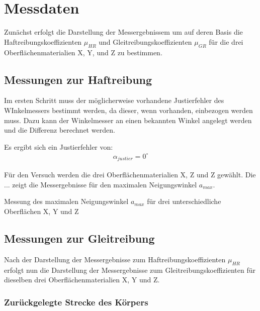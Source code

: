 \section{Messdaten}

Zunächst erfolgt die Darstellung der Messergebnissem um auf deren Basis die Haftreibungskoeffizienten $\mu_{HR}$ und Gleitreibungskoeffizienten $\mu_{GR}$ für die drei Oberflächenmaterialien X, Y, und Z zu bestimmen.

\subsection{Messungen zur Haftreibung} \label{chap:MessungHaftreibung}

Im ersten Schritt muss der möglicherweise vorhandene Justierfehler des WInkelmessers bestimmt werden, da dieser, wenn vorhanden, einbezogen werden muss. Dazu kann der Winkelmesser an einen bekannten Winkel angelegt werden und die Differenz berechnet werden. 

Es ergibt sich ein Justierfehler von:
\begin{align*}
    \alpha_{justier} = 0^\circ
\end{align*}

Für den Versuch werden die drei Oberflächenmaterialien X, Z und Z gewählt. Die ... zeigt die Messergebnisse für den maximalen Neigungswinkel $a_{max}$.

\begin{table}[h]
    \center
    \caption[Messung des maximalen Neigungswinkel]{Messung des maximalen Neigungswinkel $a_{max}$ für drei unterschiedliche Oberflächen X, Y und Z}
    
    \label{tab:maximalerNeigungswinkel}
\end{table}

\subsection{Messungen zur Gleitreibung}

Nach der Darstellung der Messergebnisse zum Haftreibungskoeffizienten $\mu_{HR}$ erfolgt nun die Darstellung der Messergebnisse zum Gleitreibungskoeffizienten für dieselben drei Oberflächenmaterialien X, Y und Z.

\subsubsection{Zurückgelegte Strecke des Körpers}

